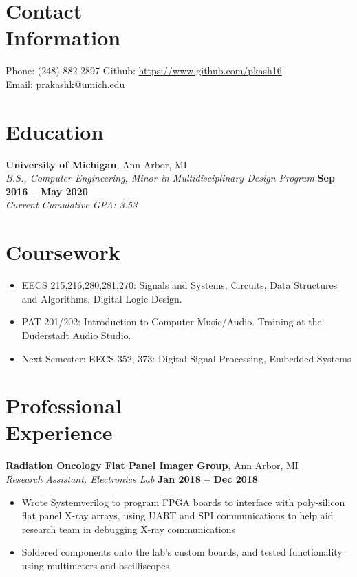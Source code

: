 \documentclass[margin,line]{resume}
\begin{document}
\begin{resume}
    \section{\mysidestyle Contact\\Information}

    Phone: (248) 882-2897       \hfill Github: \url{https://www.github.com/pkash16} \\
    \noindent Email: prakashk@umich.edu  \vspace{0mm}\\\vspace{-4.5mm}

    \section{\mysidestyle Education}

    \textbf{University of Michigan}, Ann Arbor, MI \vspace{2mm}\\\vspace{1mm}%
    \textsl{B.S., Computer Engineering, Minor in Multidisciplinary Design Program} \hfill \textbf{Sep 2016 -- May 2020}\\
   	\emph{Current Cumulative GPA: 3.53}
   	
   	
   	\section{\mysidestyle Coursework}
   	\begin{itemize}
   		\item EECS 215,216,280,281,270: Signals and Systems, Circuits, Data Structures and Algorithms, Digital Logic Design. 
   		\item PAT 201/202: Introduction to Computer Music/Audio. Training at the Duderstadt Audio Studio.
   	 	\item Next Semester: EECS 352, 373: Digital Signal Processing, Embedded Systems
   	\end{itemize}

    \section{\mysidestyle Professional\\Experience}
    
    
    \textbf{Radiation Oncology Flat Panel Imager Group}, Ann Arbor, MI \vspace{2mm}\\\vspace{1mm}%
    \textsl{Research Assistant, Electronics Lab} \hfill \textbf{Jan 2018 -- Dec 2018}
    \begin{itemize}
    	\item Wrote Systemverilog to program FPGA boards to interface with poly-silicon flat panel X-ray arrays, using UART and SPI communications to help aid research team in debugging X-ray communications
    	\item Soldered components onto the lab's custom boards, and tested functionality using multimeters and oscilliscopes
    \end{itemize}
    

\end{resume}
\end{document}
